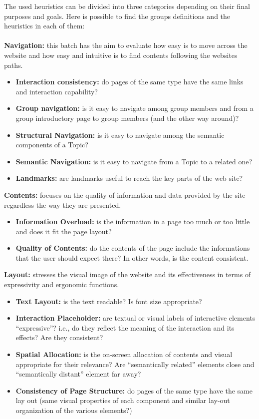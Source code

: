 The used heuristics can be divided into three categories depending on their final purposes and goals. Here is possible to find the groups definitions and the heuristics in each of them: \\ 
\\
\textbf{Navigation:} this batch has the aim to evaluate how easy is to move across the website and how easy and intuitive is to find contents following the websites paths.
	\begin{itemize}
		\item \textbf{Interaction consistency:} do pages of the same type have the same links and interaction capability?
		\item \textbf{Group navigation:} is it easy to navigate among group members and from a group introductory page to 				group members (and the other way around)?
		\item \textbf{Structural Navigation:} is it easy to navigate among the semantic components of a Topic?
		\item \textbf{Semantic Navigation:} is it easy to navigate from a Topic to a related one?
		\item \textbf{Landmarks:} are landmarks useful to reach the key parts of the web site?
	\end{itemize}
\textbf{Contents:} focuses on the quality of information and data provided by the site regardless the way they are presented. 
	\begin{itemize}
		\item \textbf{Information Overload:} is the information in a page too much or too little and does it fit the page layout?
		\item \textbf{Quality of Contents:} do the contents of the page include the informations that the user should expect 				there? In other words, is the content consistent.
	\end{itemize}
\textbf{Layout:} stresses the visual image of the website and its effectiveness in terms of expressivity and ergonomic functions. 
	\begin{itemize}
		\item \textbf{Text Layout:} is the text readable? Is font size appropriate?
		\item \textbf{Interaction Placeholder:} are textual or visual labels of interactive elements “expressive”? i.e., do they reflect 			the meaning of the interaction and its effects? Are they consistent?
		\item \textbf{Spatial Allocation:} is the on-screen allocation of contents and visual appropriate for their relevance? Are 				“semantically related” elements close and “semantically distant” element far away?
		\item \textbf{Consistency of Page Structure:} do pages of the same type have the same lay out (same visual properties of 			each component and similar lay-out organization of the various elements?) 
	\end{itemize}
